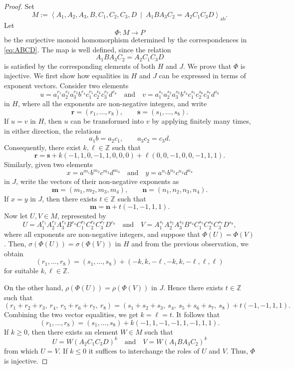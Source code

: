 \documentclass[10pt,a4paper]{amsart}
\begin{document}
\begin{proof}
Set
$$ M:= \left\langle A_1,A_2,A_3,B,C_1,C_2,C_3,D \ \middle|\ A_1BA_3C_2=A_2C_1C_3D \right\rangle_{\mathrm{ab}}. $$ 
Let $$ \Phi:M\to P $$ be the surjective monoid homomorphism determined by the correspondences in \eqref{eq:ABCD}.
The map is well defined, since the relation
\begin{equation}\label{eq:relation-M}
A_1BA_3C_2=A_2C_1C_3D
\end{equation}
is satisfied by the corresponding elements of both $H$ and $J$. We prove that $\Phi$ is injective. We first show how equalities in $H$ and $J$ can be expressed in terms of exponent vectors. Consider two elements
$$
u=a_1^{r_1}a_2^{r_2}a_3^{r_3}b^{r_4} c_1^{r_5}c_2^{r_6}c_3^{r_7}d^{r_8} \quad \text{and} \quad v=a_1^{s_1}a_2^{s_2}a_3^{s_3}b^{s_4} c_1^{s_5}c_2^{s_6}c_3^{s_7}d^{s_8}
$$
in $H$, where all the exponents are non-negative integers, and write
$$
\mathbf r=(r_1,\ldots,r_8), \qquad \mathbf s=(s_1,\ldots,s_8).
$$
If $u=v$ in $H$, then $u$ can be transformed into $v$ by applying finitely many times, in either direction, the relations
$$
a_1b=a_2c_1, \qquad a_3c_2=c_3d.
$$
Consequently, there exist $k,\ell\in\mathbb Z$ such that
$$
\mathbf r = \mathbf s +k(-1,1,0,-1,1,0,0,0) +\ell(0,0,-1,0,0,-1,1,1).
$$
Similarly, given two elements
$$
x=a^{m_1}b^{m_2}c^{m_3}d^{m_4} \quad \text{and} \quad y=a^{n_1}b^{n_2}c^{n_3}d^{n_4}
$$ in $J$, write the vectors of their non-negative exponents as
$$
\mathbf m=(m_1,m_2,m_3,m_4), \qquad \mathbf n=(n_1,n_2,n_3,n_4).
$$
If $x=y$ in $J$, then there exists $t\in\mathbb Z$ such that
$$
\mathbf m=\mathbf n+t(-1,-1,1,1).
$$
Now let $U,V\in M$, represented by
$$
U= A_1^{r_1}A_2^{r_2}A_3^{r_3}B^{r_4} C_1^{r_5}C_2^{r_6}C_3^{r_7}D^{r_8} \quad \text{and} \quad V= A_1^{s_1}A_2^{s_2}A_3^{s_3}B^{s_4} C_1^{s_5}C_2^{s_6}C_3^{s_7}D^{s_8},
$$
where all exponents are non-negative integers, and suppose that $\Phi(U)=\Phi(V)$. Then, $\sigma(\Phi(U))=\sigma(\Phi(V))$ in $H$ and from the previous observation, we obtain
$$
(r_1,\ldots,r_8) = (s_1,\ldots,s_8) +(-k,k,-\ell,-k,k,-\ell,\ell,\ell)
$$
for suitable $k,\ell\in\mathbb Z$.

On the other hand, $\rho(\Phi(U))=\rho(\Phi(V))$ in $J$.
Hence there exists $t\in\mathbb Z$ such that
$$
(r_1+r_2+r_3,\ r_4,\ r_5+r_6+r_7,\ r_8) = (s_1+s_2+s_3,\ s_4,\ s_5+s_6+s_7,\ s_8) +t(-1,-1,1,1).
$$
Combining the two vector equalities, we get $k=\ell=t$. It follows that
$$
(r_1,\ldots,r_8) = (s_1,\ldots,s_8) +k(-1,1,-1,-1,1,-1,1,1).
$$
If $k \geq 0$, then there exists an element $W \in M$ such that
$$
U=W(A_2C_1C_3D)^k \quad \text{and} \quad V=W(A_1BA_3C_2)^k
$$
from which $U=V$. If $k\leq 0$ it suffices to interchange the roles of $U$ and $V$. Thus, $\Phi$ is injective.
\end{proof}
\end{document}
